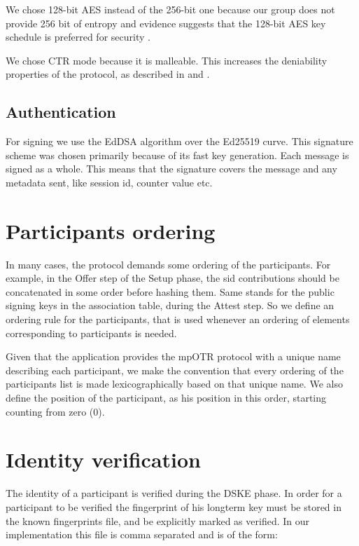 We chose 128-bit AES instead of the 256-bit one because our \dhname group does not provide 256 bit of entropy and evidence suggests that the 128-bit AES key schedule is preferred for security \cite{aes-key-recov} \cite{rijndael-improved-analysis}.

We chose CTR mode because it is malleable.
This increases the deniability properties of the protocol, as described in \cite{otr} and \cite{otr_improvedauth}.

\subsection{Authentication}
For signing we use the EdDSA algorithm over the Ed25519 curve.
This signature scheme was chosen primarily because of its fast key generation.
Each message is signed as a whole.
This means that the signature covers the message and any metadata sent, like session id, counter value etc.

\section{Participants ordering}
\label{sections:participants_ordering}
In many cases, the protocol demands some ordering of the participants. For example, in the Offer step of the Setup phase, the sid contributions should be concatenated in some order before hashing them. Same stands for the public signing keys in the association table, during the Attest step. So we define an ordering rule for the participants, that is used whenever an ordering of elements corresponding to participants is needed.

Given that the application provides the mpOTR protocol with a unique name describing each participant, we make the convention that every ordering of the participants list is made lexicographically based on that unique name. We also define the position of the participant, as his position in this order, starting counting from zero (0).

\section{Identity verification}
The identity of a participant is verified during the DSKE phase.
In order for a participant to be verified the fingerprint of his longterm key must be stored in the known fingerprints file, and be explicitly marked as verified.
In our implementation this file is comma separated and is of the form:

